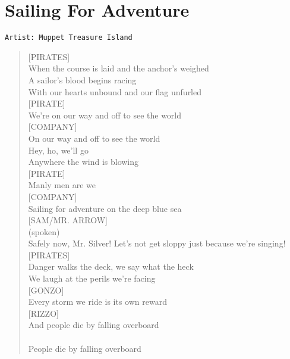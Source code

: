 \documentclass[11pt]{article}
\begin{document}
\section{Sailing For Adventure}
\label{sec:org0ad718c}
\begin{verbatim}
Artist: Muppet Treasure Island
\end{verbatim}
\begin{verse}
[PIRATES]\\
When the course is laid and the anchor's weighed\\
A sailor's blood begins racing\\
With our hearts unbound and our flag unfurled\\
\vspace*{1em}
[PIRATE]\\
We're on our way and off to see the world\\
\vspace*{1em}
[COMPANY]\\
On our way and off to see the world\\
Hey, ho, we'll go\\
Anywhere the wind is blowing\\
\vspace*{1em}
[PIRATE]\\
Manly men are we\\
\vspace*{1em}
[COMPANY]\\
Sailing for adventure on the deep blue sea\\
\vspace*{1em}
[SAM/MR. ARROW]\\
(spoken)\\
Safely now, Mr. Silver! Let's not get sloppy just because we're singing!\\
\vspace*{1em}
[PIRATES]\\
Danger walks the deck, we say what the heck\\
We laugh at the perils we're facing\\
\vspace*{1em}
[GONZO]\\
Every storm we ride is its own reward\\
\vspace*{1em}
[RIZZO]\\
And people die by falling overboard\\
[COMPANY]\\
People die by falling overboard\\

\end{verse}
\end{document}
